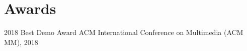 \documentclass[]{friggeri-cv}
\begin{document}
\begin{refsection}
  \nocite{*}
  \printbibliography[
    type=inproceedings, 
    title=\textbf{Proceedings of peer-reviewed conference papers}, 
    heading=subbibliography,
  ]
\end{refsection}

\newpage

\section{Awards}

\begin{entrylist}
  \entry
    {2018}
    {Best Demo Award}
    {ACM International Conference on Multimedia (ACM MM), 2018}
    {}
\end{entrylist}
\end{document}
